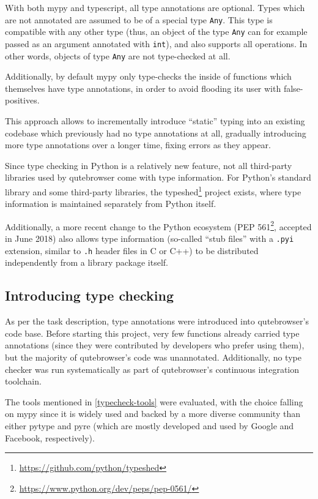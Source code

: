 \documentclass[a4paper,parskip=full,DIV=14,BCOR=15mm]{scrreprt}
\begin{document}
With both mypy and typescript, all type annotations are optional. Types which
are not annotated are assumed to be of a special type \verb|Any|. This type is
compatible with any other type (thus, an object of the type \verb|Any| can for
example passed as an argument annotated with \verb|int|), and also supports all
operations. In other words, objects of type \verb|Any| are not type-checked at
all.

Additionally, by default mypy only type-checks the inside of functions which
themselves have type annotations, in order to avoid flooding its user with
false-positives.

This approach allows to incrementally introduce ``static'' typing into an
existing codebase which previously had no type annotations at all, gradually
introducing more type annotations over a longer time, fixing errors as they
appear.

Since type checking in Python is a relatively new feature, not all third-party
libraries used by qutebrowser come with type information. For Python's standard
library and some third-party libraries, the
typeshed\footnote{\url{https://github.com/python/typeshed}} project exists,
where type information is maintained separately from Python itself.

\label{pep561}
Additionally, a more recent change to the Python ecosystem (PEP
561\footnote{\url{https://www.python.org/dev/peps/pep-0561/}}, accepted in June
2018) also allows type information (so-called ``stub files'' with a \verb|.pyi|
extension, similar to \verb|.h| header files in C or C++) to be distributed
independently from a library package itself.

\subsection{Introducing type checking}
As per the task description, type annotations were introduced into qutebrowser's
code base. Before starting this project, very few functions already carried type
annotations (since they were contributed by developers who prefer using them),
but the majority of qutebrowser's code was unannotated. Additionally, no type
checker was run systematically as part of qutebrowser's continuous integration
toolchain.

The tools mentioned in \ref{typecheck-tools} were evaluated, with the choice
falling on mypy since it is widely used and backed by a more diverse community
than either pytype and pyre (which are mostly developed and used by Google and
Facebook, respectively).
\end{document}

